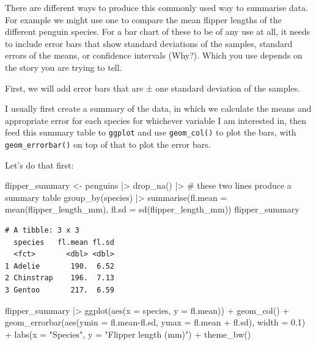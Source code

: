 \documentclass[
  letterpaper,
  DIV=11,
  numbers=noendperiod]{scrreprt}
\newenvironment{Shaded}{\begin{snugshade}}{\end{snugshade}}
\newcommand{\AttributeTok}[1]{\textcolor[rgb]{0.40,0.45,0.13}{#1}}
\newcommand{\CommentTok}[1]{\textcolor[rgb]{0.37,0.37,0.37}{#1}}
\newcommand{\FloatTok}[1]{\textcolor[rgb]{0.68,0.00,0.00}{#1}}
\newcommand{\FunctionTok}[1]{\textcolor[rgb]{0.28,0.35,0.67}{#1}}
\newcommand{\NormalTok}[1]{\textcolor[rgb]{0.00,0.23,0.31}{#1}}
\newcommand{\OtherTok}[1]{\textcolor[rgb]{0.00,0.23,0.31}{#1}}
\newcommand{\SpecialCharTok}[1]{\textcolor[rgb]{0.37,0.37,0.37}{#1}}
\newcommand{\StringTok}[1]{\textcolor[rgb]{0.13,0.47,0.30}{#1}}
\begin{document}
There are different ways to produce this commonly used way to summarise
data. For example we might use one to compare the mean flipper lengths
of the different penguin species. For a bar chart of these to be of any
use at all, it needs to include error bars that show standard deviations
of the samples, standard errors of the means, or confidence intervals
(Why?). Which you use depends on the story you are trying to tell.

First, we will add error bars that are ± one standard deviation of the
samples.

I usually first create a summary of the data, in which we calculate the
means and appropriate error for each species for whichever variable I am
interested in, then feed this summary table to \texttt{ggplot} and use
\texttt{geom\_col()} to plot the bars, with \texttt{geom\_errorbar()} on
top of that to plot the error bars.

Let's do that first:

\begin{Shaded}
\begin{Highlighting}[]
\NormalTok{flipper\_summary }\OtherTok{\textless{}{-}}\NormalTok{ penguins }\SpecialCharTok{|\textgreater{}}
  \FunctionTok{drop\_na}\NormalTok{() }\SpecialCharTok{|\textgreater{}}
  \CommentTok{\# these two lines produce a summary table}
  \FunctionTok{group\_by}\NormalTok{(species) }\SpecialCharTok{|\textgreater{}}
  \FunctionTok{summarise}\NormalTok{(}\AttributeTok{fl.mean =} \FunctionTok{mean}\NormalTok{(flipper\_length\_mm), }\AttributeTok{fl.sd =} \FunctionTok{sd}\NormalTok{(flipper\_length\_mm))}
\NormalTok{flipper\_summary}
\end{Highlighting}
\end{Shaded}

\begin{verbatim}
# A tibble: 3 x 3
  species   fl.mean fl.sd
  <fct>       <dbl> <dbl>
1 Adelie       190.  6.52
2 Chinstrap    196.  7.13
3 Gentoo       217.  6.59
\end{verbatim}

\begin{Shaded}
\begin{Highlighting}[]
\NormalTok{flipper\_summary }\SpecialCharTok{|\textgreater{}}
  \FunctionTok{ggplot}\NormalTok{(}\FunctionTok{aes}\NormalTok{(}\AttributeTok{x =}\NormalTok{ species, }\AttributeTok{y =}\NormalTok{ fl.mean)) }\SpecialCharTok{+}
  \FunctionTok{geom\_col}\NormalTok{() }\SpecialCharTok{+}
  \FunctionTok{geom\_errorbar}\NormalTok{(}\FunctionTok{aes}\NormalTok{(}\AttributeTok{ymin =}\NormalTok{ fl.mean}\SpecialCharTok{{-}}\NormalTok{fl.sd, }\AttributeTok{ymax =}\NormalTok{ fl.mean }\SpecialCharTok{+}\NormalTok{ fl.sd), }\AttributeTok{width =} \FloatTok{0.1}\NormalTok{) }\SpecialCharTok{+}
  \FunctionTok{labs}\NormalTok{(}\AttributeTok{x =} \StringTok{"Species"}\NormalTok{,}
       \AttributeTok{y =} \StringTok{"Flipper length (mm)"}\NormalTok{) }\SpecialCharTok{+}
  \FunctionTok{theme\_bw}\NormalTok{() }
\end{Highlighting}
\end{Shaded}
\end{document}
